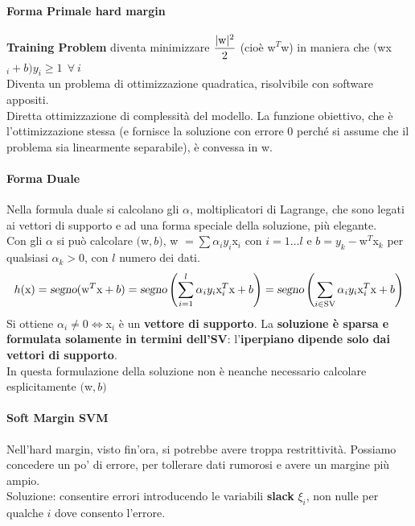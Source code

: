\documentclass[10pt]{book}
\begin{document}
\paragraph{Forma Primale hard margin} \textbf{Training Problem} diventa minimizzare $\mathlarger{\frac{|\text{w}|^2}{2}}$ (cioè w$^T$w) in maniera che $($wx$_i + b)y_i \geq 1\:\:\forall\:i$\\
Diventa un problema di ottimizzazione quadratica, risolvibile con software appositi.\\
Diretta ottimizzazione di complessità del modello. La funzione obiettivo, che è l'ottimizzazione stessa (e fornisce la soluzione con errore 0 perché si assume che il problema sia linearmente separabile), è convessa in w.
\paragraph{Forma Duale} Nella formula duale si calcolano gli $\alpha$, moltiplicatori di Lagrange, che sono legati ai vettori di supporto e ad una forma speciale della soluzione, più elegante.\\
Con gli $\alpha$ si può calcolare $($w$, b)$, w $= \sum \alpha_i y_i$x$_i$ con $i=1\ldots l$ e $b = y_k - $w$^T$x$_k$ per qualsiasi $\alpha_k > 0$, con $l$ numero dei dati.
$$h(\text{x}) = \textsl{segno}(\text{w}^T\text{x} + b) = \textsl{segno}\left(\sum_{i=1}^l \alpha_i y_i \text{x}_i^T\text{x} + b \right) = \textsl{segno}\left(\sum_{i\in \text{SV}} \alpha_i y_i \text{x}_i^T\text{x} + b \right)$$
Si ottiene $\alpha_i \neq 0 \Leftrightarrow $x$_i$ è un \textbf{vettore di supporto}. La \textbf{soluzione è sparsa e formulata solamente in termini dell'SV}: l'\textbf{iperpiano dipende solo dai vettori di supporto}.\\
In questa formulazione della soluzione non è neanche necessario calcolare esplicitamente $($w$, b)$
\paragraph{Soft Margin SVM} Nell'hard margin, visto fin'ora, si potrebbe avere troppa restrittività. Possiamo concedere un po' di errore, per tollerare dati rumorosi e avere un margine più ampio.\\
Soluzione: consentire errori introducendo le variabili \textbf{slack} $\xi_i$, non nulle per qualche $i$ dove consento l'errore.
\end{document}
